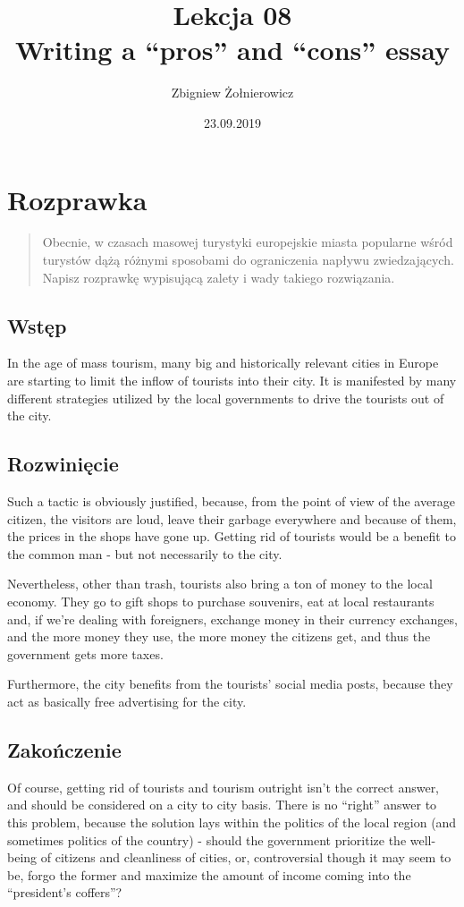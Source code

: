 \documentclass[a4paper]{article}
\begin{document}
\title{{\huge Lekcja 08} \\
{\large Writing a ``pros'' and ``cons'' essay}}
\author{Zbigniew Żołnierowicz}
\date{23.09.2019}
\maketitle
\section*{Rozprawka}
\begin{quote}
    Obecnie, w czasach masowej turystyki europejskie miasta popularne wśród turystów dążą różnymi sposobami do ograniczenia napływu zwiedzających. Napisz rozprawkę wypisującą zalety i wady takiego rozwiązania.
\end{quote}
\subsection*{Wstęp}
In the age of mass tourism, many big and historically relevant cities in Europe are starting to limit the inflow of tourists into their city.
It is manifested by many different strategies utilized by the local governments to drive the tourists out of the city.
\subsection*{Rozwinięcie}
Such a tactic is obviously justified, because, from the point of view of the average citizen, the visitors are loud, leave their garbage everywhere and because of them, the prices in the shops have gone up. Getting rid of tourists would be a benefit to the common man - but not necessarily to the city.

Nevertheless, other than trash, tourists also bring a ton of money to the local economy. They go to gift shops to purchase souvenirs, eat at local restaurants and, if we're dealing with foreigners, exchange money in their currency exchanges, and the more money they use, the more money the citizens get, and thus the government gets more taxes.

Furthermore, the city benefits from the tourists' social media posts, because they act as basically free advertising for the city.
\subsection*{Zakończenie}
Of course, getting rid of tourists and tourism outright isn't the correct answer, and should be considered on a city to city basis. There is no ``right'' answer to this problem, because the solution lays within the politics of the local region (and sometimes politics of the country) - should the government prioritize the well-being of citizens and cleanliness of cities, or, controversial though it may seem to be, forgo the former and maximize the amount of income coming into the ``president's coffers''?
\end{document}
